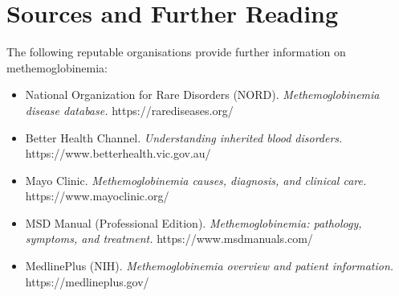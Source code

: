 \section*{Sources and Further Reading}
The following reputable organisations provide further information on methemoglobinemia:
\begin{itemize}
    \item National Organization for Rare Disorders (NORD). \textit{Methemoglobinemia disease database.} https://rarediseases.org/
    \item Better Health Channel. \textit{Understanding inherited blood disorders.} https://www.betterhealth.vic.gov.au/
    \item Mayo Clinic. \textit{Methemoglobinemia causes, diagnosis, and clinical care.} https://www.mayoclinic.org/
    \item MSD Manual (Professional Edition). \textit{Methemoglobinemia: pathology, symptoms, and treatment.} https://www.msdmanuals.com/
    \item MedlinePlus (NIH). \textit{Methemoglobinemia overview and patient information.} https://medlineplus.gov/
\end{itemize}
